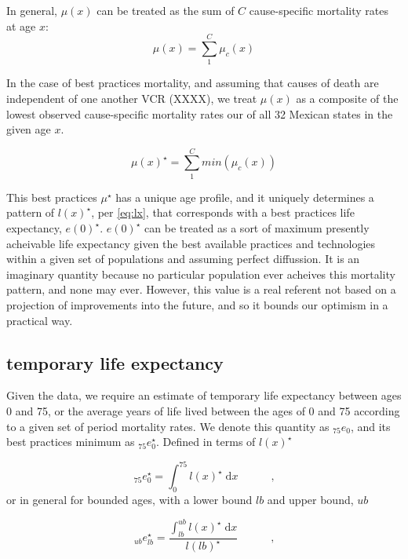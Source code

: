 \documentclass{article}
\newcommand{\dd}{\; \mathrm{d}}
\newcommand{\tc}{\quad\quad\text{,}}
\begin{document}
In general, $\mu(x)$ can be treated as the sum of $C$ cause-specific mortality
rates at age $x$:
\begin{equation}
\label{eq:mx}
\mu(x) = \sum_1^C \mu_c(x)
\end{equation}

In the case of best practices mortality, and assuming that causes of death are
independent of one another VCR (XXXX), we treat $\mu(x)$ as a composite of the
lowest observed cause-specific mortality rates our of all 32 Mexican states in the given age $x$.

\begin{equation}
\label{eq:mxmin}
\mu(x)^{\star} = \sum_1^C min(\mu_c(x))
\end{equation}

This best practices $\mu^{\star}$ has a unique age profile, and it uniquely
determines a pattern of $l(x)^{\star}$, per \eqref{eq:lx}, that corresponds with a
best practices life expectancy, $e(0)^{\star}$. $e(0)^{\star}$ can be treated as a
sort of maximum presently acheivable life expectancy given the best available
practices and technologies within a given set of populations and assuming
perfect diffussion. It is an imaginary quantity because no particular population
ever acheives this mortality pattern, and none may ever. However, this value is
a real referent not based on a projection of improvements into the future, and
so it bounds our optimism in a practical way.

\subsection{temporary life expectancy}

Given the data, we require an estimate of temporary life expectancy between ages
0 and 75, or the average years of life lived between the ages of 0 and 75 according to a
given set of period mortality rates. We denote this quantity as
${}_{75}e_0$, and its best practices minimum as ${}_{75}e_0^{\star}$. Defined in
terms of $l(x)^\star$

\begin{equation}
{}_{75}e_0^{\star} = \int _0^{75} l(x)^\star \dd x \quad \tc
\end{equation}
or in general for bounded ages, with a lower bound $lb$ and upper bound, $ub$

\begin{equation}
{}_{ub}e_{lb}^{\star} = \frac{\int _{lb}^{ub} l(x)^\star \dd x }{l(lb)^\star}
\quad \tc
\end{equation}
\end{document}
